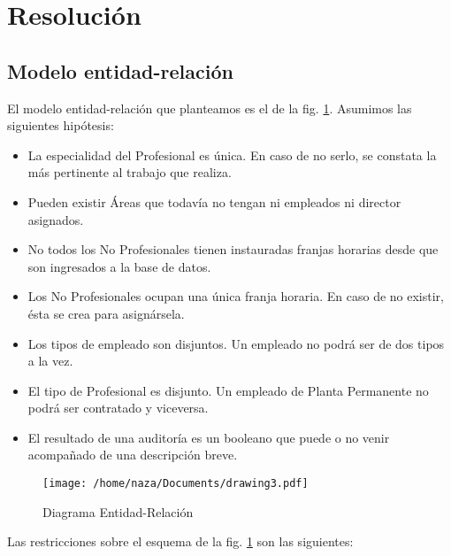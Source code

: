 \section{Resolución}
\subsection{Modelo entidad-relación}

El modelo entidad-relación que planteamos es el de la fig. \ref{fig:der}.
Asumimos las siguientes hipótesis:

\begin{itemize}
    \item La especialidad del Profesional es única. En caso de no serlo, se constata la
          más pertinente al trabajo que realiza.
    \item Pueden existir Áreas que todavía no tengan ni empleados ni director asignados.
    \item No todos los No Profesionales tienen instauradas franjas horarias desde que son
          ingresados a la base de datos.
    \item Los No Profesionales ocupan una única franja horaria. En caso de no existir,
          ésta se crea para asignársela.
    \item Los tipos de empleado son disjuntos. Un empleado no podrá ser de dos tipos a la
          vez.
    \item El tipo de Profesional es disjunto. Un empleado de Planta Permanente no podrá
          ser contratado y viceversa.
    \item El resultado de una auditoría es un booleano que puede o no venir acompañado de
          una descripción breve.
\end{itemize}

\begin{landscape}
    \begin{figure}[h]
        \centering
        \texttt{[image: /home/naza/Documents/drawing3.pdf]}
        \caption{Diagrama Entidad-Relación}
        \label{fig:der}
    \end{figure}
\end{landscape}

Las restricciones sobre el esquema de la fig. \ref{fig:der} son las siguientes:


